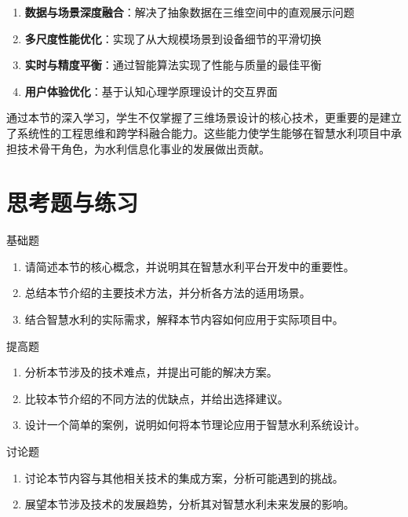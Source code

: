 \begin{enumerate}
\def\labelenumi{\arabic{enumi}.}
\tightlist
\item
  \textbf{数据与场景深度融合}：解决了抽象数据在三维空间中的直观展示问题
\item
  \textbf{多尺度性能优化}：实现了从大规模场景到设备细节的平滑切换
\item
  \textbf{实时与精度平衡}：通过智能算法实现了性能与质量的最佳平衡
\item
  \textbf{用户体验优化}：基于认知心理学原理设计的交互界面
\end{enumerate}

通过本节的深入学习，学生不仅掌握了三维场景设计的核心技术，更重要的是建立了系统性的工程思维和跨学科融合能力。这些能力使学生能够在智慧水利项目中承担技术骨干角色，为水利信息化事业的发展做出贡献。

\section{思考题与练习}

 基础题

\begin{enumerate}
\def\labelenumi{\arabic{enumi}.}
\tightlist
\item
  请简述本节的核心概念，并说明其在智慧水利平台开发中的重要性。
\item
  总结本节介绍的主要技术方法，并分析各方法的适用场景。
\item
  结合智慧水利的实际需求，解释本节内容如何应用于实际项目中。
\end{enumerate}

 提高题

\begin{enumerate}
\def\labelenumi{\arabic{enumi}.}
\setcounter{enumi}{3}
\tightlist
\item
  分析本节涉及的技术难点，并提出可能的解决方案。
\item
  比较本节介绍的不同方法的优缺点，并给出选择建议。
\item
  设计一个简单的案例，说明如何将本节理论应用于智慧水利系统设计。
\end{enumerate}

 讨论题

\begin{enumerate}
\def\labelenumi{\arabic{enumi}.}
\setcounter{enumi}{6}
\tightlist
\item
  讨论本节内容与其他相关技术的集成方案，分析可能遇到的挑战。
\item
  展望本节涉及技术的发展趋势，分析其对智慧水利未来发展的影响。
\end{enumerate}

